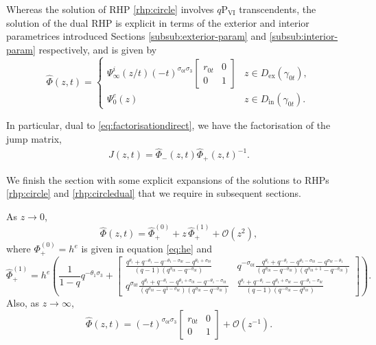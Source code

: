 \documentclass[a4paper,reqno,11pt]{amsart}
\numberwithin{equation}{section}
\numberwithin{figure}{section}
\theoremstyle{plain}
\theoremstyle{remark}
\newcommand\Psix{\textrm{P}_{\textrm{VI}}}
\newcounter{rhp}
\numberwithin{rhp}{section}
\begin{document}
Whereas the solution of RHP \ref{rhp:circle} involves $q\Psix$ transcendents, the solution of the dual RHP is explicit in terms of the exterior and interior parametrices introduced Sections \ref{subsub:exterior-param} and \ref{subsub:interior-param} respectively, and is given by
\begin{equation}\label{def:PsiHat-pm}
\widehat{\Phi}(z,t)=\begin{cases}
\Psi_\infty^i(z/t)(-t)^{\sigma_{0t}\sigma_3}\begin{bmatrix}r_{0t} & 0\\
    0 & 1\end{bmatrix}   & z\in D_{\text{ex}}(\gamma_{0t}),\\
\Psi_0^e(z) & z\in D_{\text{in}}(\gamma_{0t}).
\end{cases}
\end{equation}

In particular, dual to \eqref{eq:factorisationdirect}, we have the factorisation of the jump matrix,
\begin{align}
        J(z,t)= \widehat{\Phi}_{-}(z,t) \widehat{\Phi}_{+}(z,t)^{-1}.\label{eq:Jumpfacder}
\end{align}


We finish the section with some explicit expansions of the solutions to RHPs \ref{rhp:circle}
 and \ref{rhp:circledual} that we require in subsequent sections.

As $z\to 0$,
\begin{equation}\label{asymp:psihatplus}
    \widehat{\Phi}(z,t)= \widehat{\Phi}_{+}^{(0)} + z\, \widehat{\Phi}_{+}^{(1)}+ \mathcal{O}(z^2),  
\end{equation}
where $\Phi_{+}^{(0)}=h^e$ is given in equation \eqref{eq:he} and
\begin{equation}\label{asymp:psihatplus0} 
 \widehat{\Phi}_{+}^{(1)}=h^e\left(\frac{1}{1-q}q^{-\theta_1 \sigma_3}+
 \begin{bmatrix}
\frac{q^{\theta _i}+q^{-\theta _i}-q^{-\theta _1-\sigma_{0t} }-q^{\theta _1+\sigma_{0t} }}{(q-1) \left(q^{\sigma_{0t} }-q^{-\sigma_{0t} }\right)} &
q^{-\sigma_{0t} } \frac{ q^{\theta _i}+q^{-\theta _i}-q^{\theta _1-\sigma_{0t} }-q^{\sigma_{0t} -\theta _1}}{\left(q^{\sigma_{0t} }-q^{-\sigma_{0t} }\right) \left(q^{\sigma_{0t} +1}-q^{-\sigma_{0t} }\right)}\\
q^{\sigma_{0t} }\frac{ q^{\theta _i}+q^{-\theta _i}-q^{\theta _1+\sigma_{0t} }-q^{-\theta _1-\sigma_{0t} }}{\left(q^{\sigma_{0t} }-q^{1-\sigma_{0t} }\right) \left(q^{\sigma_{0t} }-q^{-\sigma_{0t} }\right)} & 
\frac{q^{\theta _i}+q^{-\theta _i}-q^{\theta _1+\sigma_{0t} }-q^{-\theta _1-\sigma_{0t} }}{(q-1) \left(q^{-\sigma_{0t} }-q^{\sigma_{0t} }\right)}
 \end{bmatrix}
 \right).
\end{equation}
Also, as $z\rightarrow \infty$,
\begin{equation*}
       \widehat{\Phi}(z,t)= (-t)^{\sigma_{0t}\sigma_3}\begin{bmatrix}r_{0t} & 0\\
    0 & 1\end{bmatrix}+ \mathcal{O}(z^{-1}). \label{asymp:Psimin}  
\end{equation*}
\end{document}
